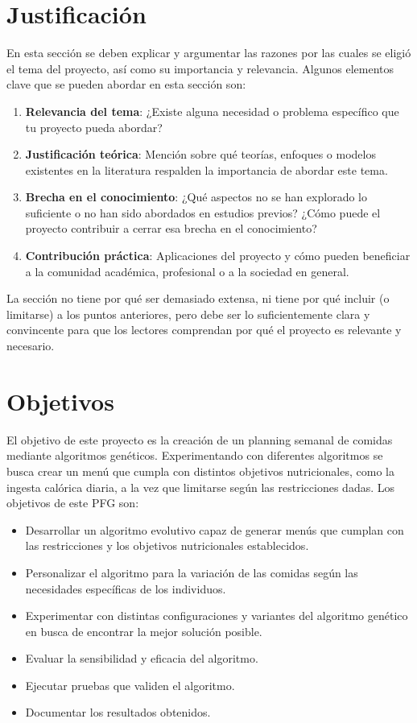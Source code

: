 \section{Justificación}

En esta sección se deben explicar y argumentar las razones por las cuales se eligió el tema del proyecto, así como su importancia y relevancia. Algunos elementos clave que se pueden abordar en esta sección son:

\begin{enumerate}
    \item \textbf{Relevancia del tema}: ¿Existe alguna necesidad o problema específico que tu proyecto pueda abordar?
    \item \textbf{Justificación teórica}: Mención sobre qué teorías, enfoques o modelos existentes en la literatura respalden la importancia de abordar este tema.
    \item \textbf{Brecha en el conocimiento}: ¿Qué aspectos no se han explorado lo suficiente o no han sido abordados en estudios previos? ¿Cómo puede el proyecto contribuir a cerrar esa brecha en el conocimiento?
    \item \textbf{Contribución práctica}: Aplicaciones del proyecto y cómo pueden beneficiar a la comunidad académica, profesional o a la sociedad en general.
\end{enumerate}

La sección no tiene por qué ser demasiado extensa, ni tiene por qué incluir (o limitarse) a los puntos anteriores, pero debe ser lo suficientemente clara y convincente para que los lectores comprendan por qué el proyecto es relevante y necesario.


\section{Objetivos}

El objetivo de este proyecto es la creación de un planning semanal de comidas mediante algoritmos genéticos. Experimentando con diferentes algoritmos se busca crear un menú que cumpla con distintos objetivos nutricionales, como la ingesta calórica diaria, a la vez que limitarse según las restricciones dadas. Los objetivos de este PFG son:

\begin{itemize}
    \item Desarrollar un algoritmo evolutivo capaz de generar menús que cumplan con las restricciones y los objetivos nutricionales establecidos.
    \item Personalizar el algoritmo para la variación de las comidas según las necesidades específicas de los individuos.
    \item Experimentar con distintas configuraciones y variantes del algoritmo genético en busca de encontrar la mejor solución posible.
    \item Evaluar la sensibilidad y eficacia del algoritmo.
    \item Ejecutar pruebas que validen el algoritmo.
    \item Documentar los resultados obtenidos.
\end{itemize}

